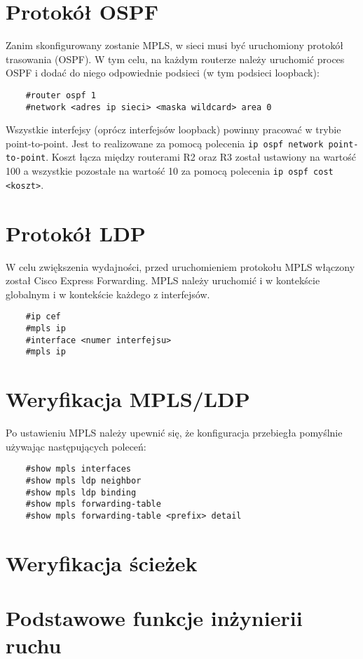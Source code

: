 \documentclass[a4paper,12pt,notitlepage]{article}
\begin{document}
\section{Protokół OSPF}

Zanim skonfigurowany zostanie MPLS, w sieci musi być uruchomiony protokół trasowania (OSPF). W tym celu, na każdym routerze należy uruchomić proces OSPF i dodać do niego odpowiednie podsieci (w tym podsieci loopback):
\begin{verbatim}
    #router ospf 1
    #network <adres ip sieci> <maska wildcard> area 0
\end{verbatim}

Wszystkie interfejsy (oprócz interfejsów loopback) powinny pracować w trybie point-to-point. Jest to realizowane za pomocą polecenia \texttt{ip ospf network point-to-point}. Koszt łącza między routerami R2 oraz R3 został ustawiony na wartość 100 a wszystkie pozostałe na wartość 10 za pomocą polecenia \texttt{ip ospf cost <koszt>}.


\section{Protokół LDP}

W celu zwiększenia wydajności, przed uruchomieniem protokołu MPLS włączony został Cisco Express Forwarding. MPLS należy uruchomić i w kontekście globalnym i w kontekście każdego z interfejsów.
\begin{verbatim}
    #ip cef
    #mpls ip
    #interface <numer interfejsu>
    #mpls ip
\end{verbatim}

\section{Weryfikacja MPLS/LDP}

Po ustawieniu MPLS należy upewnić się, że konfiguracja przebiegła pomyślnie używając następujących poleceń:
\begin{verbatim}
    #show mpls interfaces
    #show mpls ldp neighbor
    #show mpls ldp binding
    #show mpls forwarding-table
    #show mpls forwarding-table <prefix> detail
\end{verbatim}


\section{Weryfikacja ścieżek}

\section{Podstawowe funkcje inżynierii ruchu}
\end{document}

